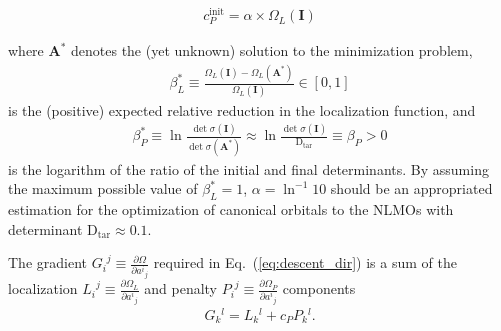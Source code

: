 \documentclass[aps,prl,reprint,amsmath,amssymb]{revtex4-1}
\begin{document}
%
\begin{equation} \label{eq:cp-beta}
\begin{split} 
c_P^{\text{init}} = \alpha \times \Omega_L(\mathbf{I})
\end{split}
\end{equation}
%


where $\mathbf{A}^{\ast}$ denotes the (yet unknown) solution to the minimization problem, 
%
\begin{equation} 
\begin{split} 
\beta_L^{\ast} \equiv \frac{\Omega_L(\mathbf{I})- \Omega_L(\mathbf{A}^{\ast})}{\Omega_L(\mathbf{I})} \in [0,1]
\end{split}
\end{equation}
%
is the (positive) expected relative reduction in the localization function, and 
%
\begin{equation} \label{eq:betap}
\begin{split} 
\beta_P^{\ast} \equiv \ln \frac{\det \sigma(\mathbf{I})}{ \det \sigma(\mathbf{A}^{\ast}) } \approx \ln \frac{\det \sigma(\mathbf{I})}{ \text{D}_{\text{tar}} } \equiv \beta_P > 0
\end{split}
\end{equation}
%
is the logarithm of the ratio of the initial and final determinants.
By assuming the maximum possible value of $\beta_L^{\ast}=1$, $\alpha = \ln^{-1} 10$ should be an appropriated estimation for the optimization of canonical orbitals to the NLMOs with determinant $ \text{D}_{\text{tar}} \approx 0.1$.

The gradient ${G_i}^j \equiv \frac{\partial \Omega}{\partial {a^i}_j}$  required in Eq.~(\ref{eq:descent_dir}) is a sum of the localization ${L_i}^j \equiv \frac{\partial \Omega_L}{\partial {a^i}_j}$ and penalty ${P_i}^j \equiv \frac{\partial \Omega_P}{\partial {a^i}_j}$ components
%
\begin{equation} \label{eq:grad}
\begin{split}
G{_k}^{l} = L{_k}^{l} + c_P P{_k}^{l}.
\end{split}
\end{equation}
%
\end{document}
